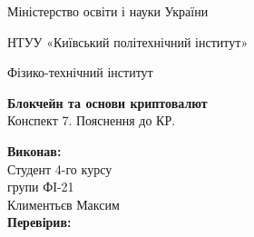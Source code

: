 \documentclass{article}
\begin{document}
    \begin{titlepage}
        \begin{center}

        Міністерство освіти і науки України
        
        НТУУ «Київський політехнічний інститут»
        
        Фізико-технічний інститут
        \vspace{3.3cm}
        
        {\textbf{Блокчейн та основи криптовалют}\\Конспект 7. Пояснення до КР.}

        \vspace{8.5cm}

        \begin{flushright}
            \textbf{Виконав:}\\Студент 4-го курсу\\групи ФІ-21\\Климентьєв Максим\\
            \textbf{Перевірив:}\\\text{\_\_\_\_\_\_\_\_\_\_\_\_\_\_\_\_\_\_}
        \end{flushright}

        \end{center}
    \end{titlepage}
    \newpage

    \tableofcontents
    \cleardoublepage
    \setcounter{page}{3}

    \newpage
\end{document}
